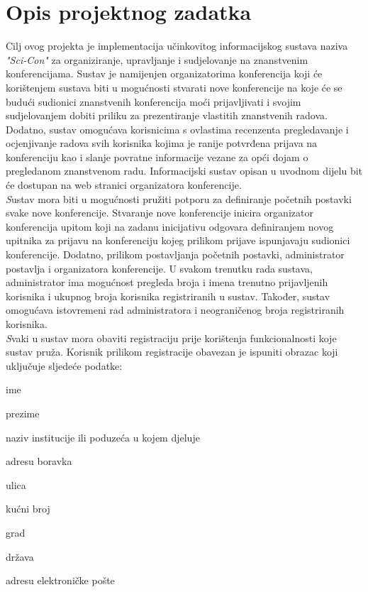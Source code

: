 \chapter{Opis projektnog zadatka}
		
		Cilj ovog projekta je implementacija učinkovitog informacijskog sustava naziva \textit{"Sci-Con"} za organiziranje, upravljanje i sudjelovanje na znanstvenim konferencijama. Sustav je namijenjen organizatorima konferencija koji će korištenjem sustava biti u mogućnosti stvarati nove konferencije na koje će se budući sudionici znanstvenih konferencija moći prijavljivati i svojim sudjelovanjem dobiti priliku za prezentiranje vlastitih znanstvenih radova. Dodatno, sustav omogućava korisnicima s ovlastima recenzenta pregledavanje i ocjenjivanje radova svih korisnika kojima je ranije potvrđena prijava na konferenciju kao i slanje povratne informacije vezane za opći dojam o pregledanom znanstvenom radu. Informacijski sustav opisan u uvodnom dijelu bit će dostupan na web stranici organizatora konferencije.\\
		     
		    
		\textit Sustav mora biti u mogućnosti pružiti potporu za definiranje početnih postavki svake nove konferencije. Stvaranje nove konferencije inicira organizator konferencija upitom  koji na zadanu inicijativu odgovara definiranjem novog upitnika za prijavu na konferenciju kojeg prilikom prijave ispunjavaju sudionici konferencije. Dodatno, prilikom postavljanja početnih postavki, administrator postavlja i organizatora konferencije. U svakom trenutku rada sustava, administrator ima mogućnost pregleda broja i imena trenutno prijavljenih korisnika i ukupnog broja korisnika registriranih u sustav. Također, sustav omogućava istovremeni rad administratora i neograničenog broja registriranih korisnika.\\
		
		\textit Svaki u sustav  mora obaviti registraciju prije korištenja funkcionalnosti koje sustav pruža. Korisnik prilikom registracije obavezan je ispuniti obrazac koji uključuje sljedeće podatke: 
		
		\begin{packed_item}
			
			\item ime
			\item prezime
			\item naziv institucije ili poduzeća u kojem djeluje
			\item adresu boravka
			\begin{packed_item}
				\item ulica
				\item kućni broj
				\item grad
				\item država
			\end{packed_item}
			\item adresu elektroničke pošte
		\end{packed_item}
		
